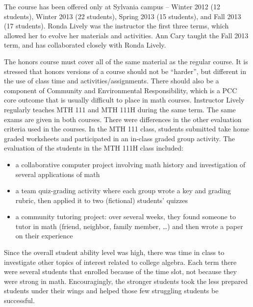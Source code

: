 The course has been offered only at Sylvania campus -- Winter 2012 (12
students), Winter 2013 (22 students), Spring 2013 (15 students), and Fall 2013
(17 students).  Ronda Lively was the instructor the first three terms, which
allowed her to evolve her materials and activities.  Ann Cary taught the
Fall 2013 term, and has collaborated closely with Ronda Lively. 

The honors course must cover all of the same material as the regular course. It
is stressed that honors versions of a course should not be ``harder'', but
different in the use of class time and activities/assignments.  There should
also be a component of Community and Environmental Responsibility, which is a
PCC core outcome that is usually difficult to place in math courses.  Instructor
Lively regularly teaches MTH 111 and MTH 111H during the same term.  The same
exams are given in both courses.  There were differences in the other evaluation
criteria used in the courses.  In the MTH 111 class, students submitted take
home graded worksheets and participated in an in-class graded group activity.
The evaluation of the students in the MTH 111H class included:
\begin{itemize}
\item a collaborative computer project involving math history and investigation
  of several applications of math
\item a team quiz-grading activity where each group wrote a key and grading
  rubric, then applied it to two (fictional) students' quizzes
\item a community tutoring project:  over several weeks, they found someone to
  tutor in math (friend, neighbor, family member, \ldots) and then wrote a paper
  on their experience
\end{itemize}
Since the overall student ability level was high, there was time in class to
investigate other topics of interest related to college algebra.  Each term
there were several students that enrolled because of the time slot,
not because they were strong in math.  Encouragingly, the
stronger students took the less prepared students under their wings and helped
those few struggling students be successful.


